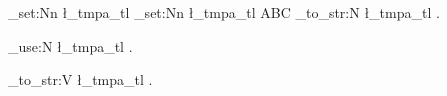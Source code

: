 \documentclass{article}
\begin{document}
\ExplSyntaxOn
\tl_set:Nn \l_tmpa_tl 
  { \tl_set:Nn \l_tmpa_tl { ABC } }
\tl_to_str:N \l_tmpa_tl .\par
\tl_use:N \l_tmpa_tl .\par
\tl_to_str:V \l_tmpa_tl .\par
\ExplSyntaxOff
\end{document}
